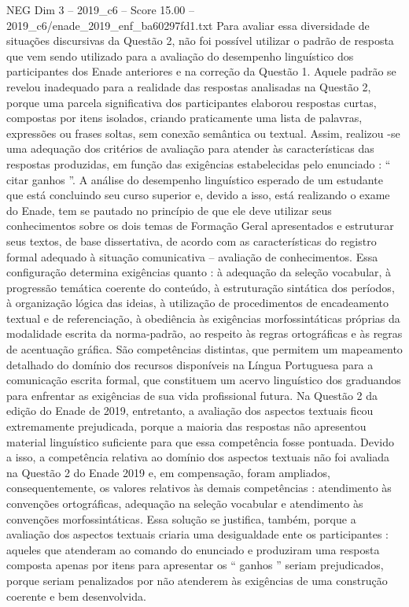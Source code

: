 \begin{textsample}{NEG Dim 3 – 2019\_c6 – Score 15.00 – 2019\_c6/enade\_2019\_enf\_ba60297fd1.txt}
Para avaliar essa diversidade de situações discursivas da Questão 2, não foi possível utilizar o padrão de resposta que vem sendo utilizado para a avaliação do desempenho linguístico dos participantes dos Enade anteriores e na correção da Questão 1.
Aquele padrão se revelou inadequado para a realidade das respostas analisadas na Questão 2, porque uma parcela significativa dos participantes elaborou respostas curtas, compostas por itens isolados, criando praticamente uma lista de palavras, expressões ou frases soltas, sem conexão semântica ou textual.
Assim, realizou -se uma adequação dos critérios de avaliação para atender às características das respostas produzidas, em função das exigências estabelecidas pelo enunciado : “ citar ganhos ”.
A análise do desempenho linguístico esperado de um estudante que está concluindo seu curso superior e, devido a isso, está realizando o exame do Enade, tem se pautado no princípio de que ele deve utilizar seus conhecimentos sobre os dois temas de Formação Geral apresentados e estruturar seus textos, de base dissertativa, de acordo com as características do registro formal adequado à situação comunicativa – avaliação de conhecimentos.
Essa configuração determina exigências quanto : à adequação da seleção vocabular, à progressão temática coerente do conteúdo, à estruturação sintática dos períodos, à organização lógica das ideias, à utilização de procedimentos de encadeamento textual e de referenciação, à obediência às exigências morfossintáticas próprias da modalidade escrita da norma-padrão, ao respeito às regras ortográficas e às regras de acentuação gráfica.
São competências distintas, que permitem um mapeamento detalhado do domínio dos recursos disponíveis na Língua Portuguesa para a comunicação escrita formal, que constituem um acervo linguístico dos graduandos para enfrentar as exigências de sua vida profissional futura.
Na Questão 2 da edição do Enade de 2019, entretanto, a avaliação dos aspectos textuais ficou extremamente prejudicada, porque a maioria das respostas não apresentou material linguístico suficiente para que essa competência fosse pontuada.
Devido a isso, a competência relativa ao domínio dos aspectos textuais não foi avaliada na Questão 2 do Enade 2019 e, em compensação, foram ampliados, consequentemente, os valores relativos às demais competências : atendimento às convenções ortográficas, adequação na seleção vocabular e atendimento às convenções morfossintáticas.
Essa solução se justifica, também, porque a avaliação dos aspectos textuais criaria uma desigualdade ente os participantes : aqueles que atenderam ao comando do enunciado e produziram uma resposta composta apenas por itens para apresentar os “ ganhos ” seriam prejudicados, porque seriam penalizados por não atenderem às exigências de uma construção coerente e bem desenvolvida.

\end{textsample}
